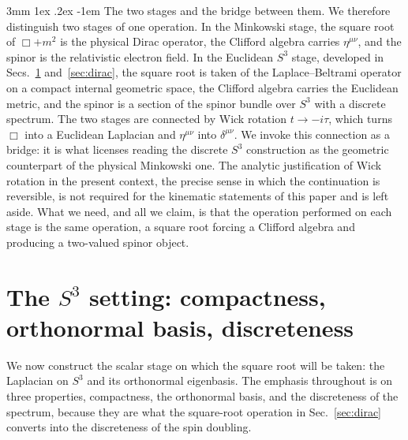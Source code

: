 \documentclass[%
 reprint, amsmath,amssymb, aps, prb, ]{revtex4-2}
\makeatletter
\numberwithin{equation}{section}
\renewcommand\paragraph{%
  \@startsection{paragraph}{4}{\z@}%
    {3mm \@plus 1ex \@minus .2ex}%
    {-1em}%
    {\normalfont\normalsize\itshape}}
\makeatother
\begin{document}
\paragraph{The two stages and the bridge between them.}
We therefore distinguish two stages of one operation. In the Minkowski stage, the square root of $\Box+m^{2}$ is the physical Dirac operator, the Clifford algebra carries $\eta^{\mu\nu}$, and the spinor is the relativistic electron field. In the Euclidean $S^{3}$ stage, developed in Secs.~\ref{sec:s3} and~\ref{sec:dirac}, the square root is taken of the Laplace--Beltrami operator on a compact internal geometric space, the Clifford algebra carries the Euclidean metric, and the spinor is a section of the spinor bundle over $S^{3}$ with a discrete spectrum. The two stages are connected by Wick rotation $t\to -i\tau$, which turns $\Box$ into a Euclidean Laplacian and $\eta^{\mu\nu}$ into $\delta^{\mu\nu}$. We invoke this connection as a bridge: it is what licenses reading the discrete $S^{3}$ construction as the geometric counterpart of the physical Minkowski one. The analytic justification of Wick rotation in the present context, the precise sense in which the continuation is reversible, is not required for the kinematic statements of this paper and is left aside. What we need, and all we claim, is that the operation performed on each stage is the same operation, a square root forcing a Clifford algebra and producing a two-valued spinor object.

\section{The $S^{3}$ setting: compactness, orthonormal basis, discreteness}
\label{sec:s3}

We now construct the scalar stage on which the square root will be taken: the Laplacian on $S^{3}$ and its orthonormal eigenbasis. The emphasis throughout is on three properties, compactness, the orthonormal basis, and the discreteness of the spectrum, because they are what the square-root operation in Sec.~\ref{sec:dirac} converts into the discreteness of the spin doubling.
\end{document}
